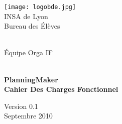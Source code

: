 \begin{titlepage}



\begin{minipage}{0.3\textwidth}
\centering
\texttt{[image: logobde.jpg]}
\\
INSA de Lyon \\
Bureau des Élèves \\

\end{minipage}
\hfill
\begin{minipage}{0.3\textwidth}
\centering
 
~
\\[3cm]

Équipe Orga IF
\end{minipage}


\begin{center} 
\hrulefill \\[0.4cm]
{ \Huge \bfseries PlanningMaker}\\ {  \bfseries Cahier Des Charges Fonctionnel} \\[0.4cm]
 \hrulefill






\vfill {\Large Version 0.1} \\[2cm]
{ Septembre 2010  } \\





\end{center}


\end{titlepage}

